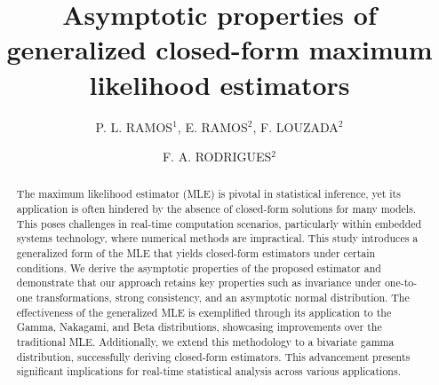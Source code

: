 \documentclass[lineno]{biometrika}
\begin{document}



\title{Asymptotic properties of generalized closed-form maximum likelihood estimators}

\author{P. L. RAMOS$^{1}$, E. RAMOS$^{2}$, F. LOUZADA$^{2}$ \and F. A. RODRIGUES$^{2}$}


\maketitle

\begin{abstract}
The maximum likelihood estimator (MLE) is pivotal in statistical inference, yet its application is often hindered by the absence of closed-form solutions for many models. This poses challenges in real-time computation scenarios, particularly within embedded systems technology, where numerical methods are impractical. This study introduces a generalized form of the MLE that yields closed-form estimators under certain conditions. We derive the asymptotic properties of the proposed estimator and demonstrate that our approach retains key properties such as invariance under one-to-one transformations, strong consistency, and an asymptotic normal distribution. The effectiveness of the generalized MLE is exemplified through its application to the Gamma, Nakagami, and Beta distributions, showcasing improvements over the traditional MLE. Additionally, we extend this methodology to a bivariate gamma distribution, successfully deriving closed-form estimators. This advancement presents significant implications for real-time statistical analysis across various applications.
\end{abstract}
\end{document}
